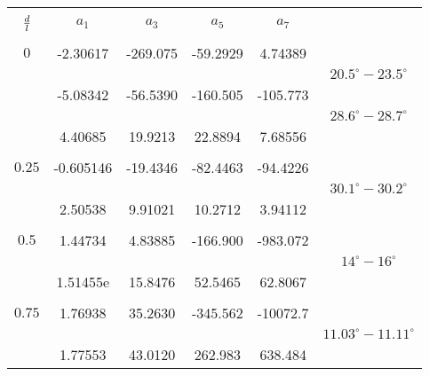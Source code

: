 \begin{table}[!h]

\begin{center}
\setlength{\unitlength}{\textwidth}

\begin{tabular}{c c c c c c} %
\hline\hline %
\\[0.0ex]
$\frac{d}{l}$ & $a_1$ & $a_3$ & $a_5$ & $a_7$ & \\ [-0.1ex] %
\hline 

\\[-0.2ex]%
$0$ &  -2.30617 & -269.075 & -59.2929 & 4.74389 &\\[-0.6ex]
    &  &  &  & & $20.5^{\circ}-23.5^{\circ}$\\[-0.8ex]
    & -5.08342 & -56.5390 & -160.505 & -105.773 & \\[0.0ex]
  &  &  &  & & $28.6^{\circ}-28.7^{\circ}$\\[-0.6ex]
    &  4.40685 & 19.9213 & 22.8894 & 7.68556 & \\[0.2ex]


\\[0.8ex]%
$0.25$ & -0.605146 & -19.4346 &-82.4463 & -94.4226\\[0.0ex]
&  &  &  & & $30.1^{\circ}-30.2^{\circ}$\\[-0.4ex]
      & 2.50538 & 9.91021  & 10.2712 & 3.94112 \\[-0.2ex]

 \\[0.8ex]%


 $0.5$ & 1.44734 & 4.83885  & -166.900 & -983.072 \\[0.0ex]%
 &  &  &  & & $14^{\circ}-16^{\circ}$\\[0.0ex]

  & 1.51455e & 15.8476 & 52.5465 & 62.8067 \\ [0.4ex] %
  
  \\[0.8ex]%
  
   $0.75$ & 1.76938 & 35.2630 & -345.562 & -10072.7 \\[-0.4ex]
&  &  &  & & $11.03^{\circ}-11.11^{\circ}$\\[-0.4ex]
          & 1.77553 & 43.0120 & 262.983 & 638.484 \\ [0.2ex]
          

\end{tabular}
\end{center}
\end{table}

